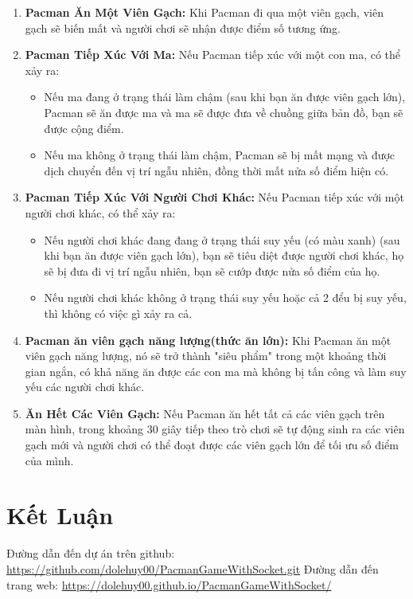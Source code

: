 \documentclass[a4paper]{article}
\begin{document}
\begin{enumerate}
    \item \textbf{Pacman Ăn Một Viên Gạch:} Khi Pacman đi qua một viên gạch, viên gạch sẽ biến mất và người chơi sẽ nhận được điểm số tương ứng.
    \item \textbf{Pacman Tiếp Xúc Với Ma:} Nếu Pacman tiếp xúc với một con ma, có thể xảy ra:
        \begin{itemize}
            \item Nếu ma đang ở trạng thái làm chậm (sau khi bạn ăn được viên gạch lớn), Pacman sẽ ăn được ma và ma sẽ được đưa về chuồng giữa bản đồ, bạn sẽ được cộng điểm.
            \item Nếu ma không ở trạng thái làm chậm, Pacman sẽ bị mất mạng và được dịch chuyển đến vị trí ngẫu nhiên, đồng thời mất nửa số điểm hiện có.
        \end{itemize}
     \item \textbf{Pacman Tiếp Xúc Với Người Chơi Khác:} Nếu Pacman tiếp xúc với một người chơi khác, có thể xảy ra:
        \begin{itemize}
            \item Nếu người chơi khác đang đang ở trạng thái suy yếu (có màu xanh) (sau khi bạn ăn được viên gạch lớn), bạn sẽ tiêu diệt được người chơi khác, họ sẽ bị đưa đi vị trí ngẫu nhiên, bạn sẽ cướp được nửa số điểm của họ.
            \item Nếu người chơi khác không ở trạng thái suy yếu hoặc cả 2 đểu bị suy yếu, thì không có việc gì xảy ra cả.
        \end{itemize}    
    \item \textbf{Pacman ăn viên gạch năng lượng(thức ăn lớn):} Khi Pacman ăn một viên gạch năng lượng, nó sẽ trở thành "siêu phẩm" trong một khoảng thời gian ngắn, có khả năng ăn được các con ma mà không bị tấn công và làm suy yếu các người chơi khác.
    \item \textbf{Ăn Hết Các Viên Gạch:} Nếu Pacman ăn hết tất cả các viên gạch trên màn hình, trong khoảng 30 giây tiếp theo trò chơi sẽ tự động sinh ra các viên gạch mới và người chơi có thể đoạt được các viên gạch lớn để tối ưu số điểm của mình.
\end{enumerate}
\newpage
\section{Kết Luận}
Đường dẫn đến dự án trên github: \href{https://github.com/dolehuy00/PacmanGameWithSocket.git}{https://github.com/dolehuy00/PacmanGameWithSocket.git}
Đường dẫn đến trang web: \href{https://dolehuy00.github.io/PacmanGameWithSocket/}{https://dolehuy00.github.io/PacmanGameWithSocket/}
\end{document}
